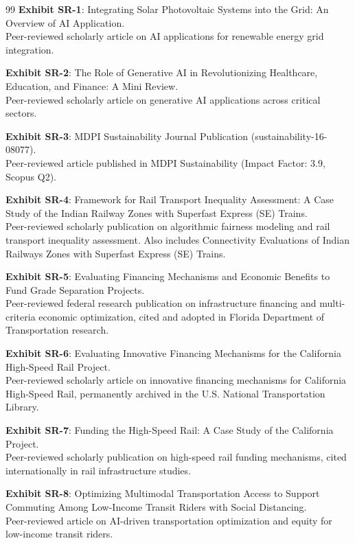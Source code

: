 \documentclass[11pt]{article}
\begin{document}
\begin{thebibliography}{99}
\textbf{Exhibit SR-1}: Integrating Solar Photovoltaic Systems into the Grid: An Overview of AI Application.
\\Peer-reviewed scholarly article on AI applications for renewable energy grid integration.

\textbf{Exhibit SR-2}: The Role of Generative AI in Revolutionizing Healthcare, Education, and Finance: A Mini Review.
\\Peer-reviewed scholarly article on generative AI applications across critical sectors.

\textbf{Exhibit SR-3}: MDPI Sustainability Journal Publication (sustainability-16-08077).
\\Peer-reviewed article published in MDPI Sustainability (Impact Factor: 3.9, Scopus Q2).

\textbf{Exhibit SR-4}: Framework for Rail Transport Inequality Assessment: A Case Study of the Indian Railway Zones with Superfast Express (SE) Trains.
\\Peer-reviewed scholarly publication on algorithmic fairness modeling and rail transport inequality assessment. Also includes Connectivity Evaluations of Indian Railways Zones with Superfast Express (SE) Trains.

\textbf{Exhibit SR-5}: Evaluating Financing Mechanisms and Economic Benefits to Fund Grade Separation Projects.
\\Peer-reviewed federal research publication on infrastructure financing and multi-criteria economic optimization, cited and adopted in Florida Department of Transportation research.

\textbf{Exhibit SR-6}: Evaluating Innovative Financing Mechanisms for the California High-Speed Rail Project.
\\Peer-reviewed scholarly article on innovative financing mechanisms for California High-Speed Rail, permanently archived in the U.S. National Transportation Library.

\textbf{Exhibit SR-7}: Funding the High-Speed Rail: A Case Study of the California Project.
\\Peer-reviewed scholarly publication on high-speed rail funding mechanisms, cited internationally in rail infrastructure studies.

\textbf{Exhibit SR-8}: Optimizing Multimodal Transportation Access to Support Commuting Among Low-Income Transit Riders with Social Distancing.
\\Peer-reviewed article on AI-driven transportation optimization and equity for low-income transit riders.


\end{thebibliography}
\end{document}
